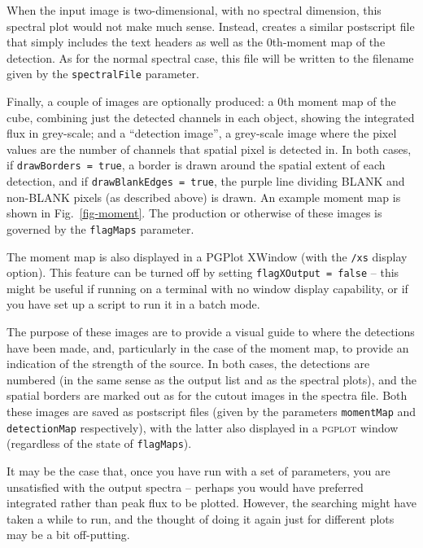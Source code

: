 
When the input image is two-dimensional, with no spectral dimension,
this spectral plot would not make much sense. Instead, \duchamp
creates a similar postscript file that simply includes the text
headers as well as the 0th-moment map of the detection. As for the
normal spectral case, this file will be written to the filename given
by the \texttt{spectralFile} parameter.


Finally, a couple of images are optionally produced: a 0th moment map
of the cube, combining just the detected channels in each object,
showing the integrated flux in grey-scale; and a ``detection image'',
a grey-scale image where the pixel values are the number of channels
that spatial pixel is detected in. In both cases, if
\texttt{drawBorders = true}, a border is drawn around the spatial
extent of each detection, and if \texttt{drawBlankEdges = true}, the
purple line dividing BLANK and non-BLANK pixels (as described above)
is drawn. An example moment map is shown in Fig.~\ref{fig-moment}.
The production or otherwise of these images is governed by the
\texttt{flagMaps} parameter.

The moment map is also displayed in a PGPlot XWindow (with the
\texttt{/xs} display option). This feature can be turned off by
setting \texttt{flagXOutput = false} -- this might be useful if
running \duchamp on a terminal with no window display capability, or
if you have set up a script to run it in a batch mode.

The purpose of these images are to provide a visual guide to where the
detections have been made, and, particularly in the case of the moment
map, to provide an indication of the strength of the source. In both
cases, the detections are numbered (in the same sense as the output
list and as the spectral plots), and the spatial borders are marked
out as for the cutout images in the spectra file. Both these images
are saved as postscript files (given by the parameters
\texttt{momentMap} and \texttt{detectionMap} respectively), with the
latter also displayed in a \textsc{pgplot} window (regardless of the
state of \texttt{flagMaps}).



\label{sec-reuse}

It may be the case that, once you have run \duchamp with a set of
parameters, you are unsatisfied with the output spectra -- perhaps you
would have preferred integrated rather than peak flux to be
plotted. However, the searching might have taken a while to run, and
the thought of doing it again just for different plots may be a bit
off-putting.

